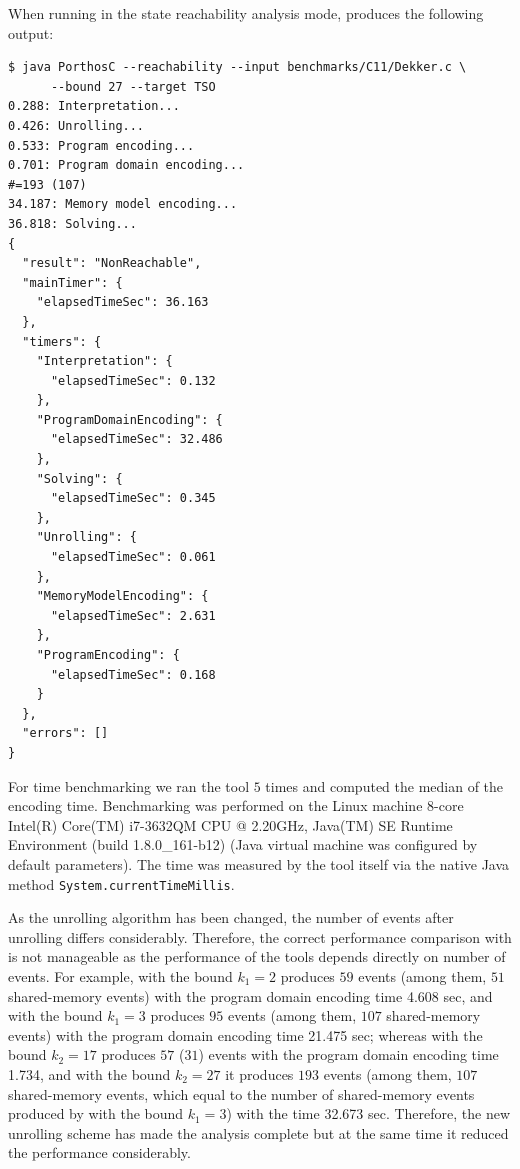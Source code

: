 When running in the state reachability analysis mode, \porthos[2] produces the following output:

\begin{lstlisting}
$ java PorthosC --reachability --input benchmarks/C11/Dekker.c \
      --bound 27 --target TSO
0.288: Interpretation...
0.426: Unrolling...
0.533: Program encoding...
0.701: Program domain encoding...
#=193 (107)
34.187: Memory model encoding...
36.818: Solving...
{
  "result": "NonReachable",
  "mainTimer": {
    "elapsedTimeSec": 36.163
  },
  "timers": {
    "Interpretation": {
      "elapsedTimeSec": 0.132
    },
    "ProgramDomainEncoding": {
      "elapsedTimeSec": 32.486
    },
    "Solving": {
      "elapsedTimeSec": 0.345
    },
    "Unrolling": {
      "elapsedTimeSec": 0.061
    },
    "MemoryModelEncoding": {
      "elapsedTimeSec": 2.631
    },
    "ProgramEncoding": {
      "elapsedTimeSec": 0.168
    }
  },
  "errors": []
}
\end{lstlisting}

For time benchmarking we ran the tool $5$ times and computed the median of the encoding time.
Benchmarking was performed on the Linux machine 8-core Intel(R) Core(TM) i7-3632QM CPU @ 2.20GHz, Java(TM) SE Runtime Environment (build 1.8.0\_161-b12) (Java virtual machine was configured by default parameters).
The time was measured by the tool itself via the native Java method \texttt{System.currentTimeMillis}.

As the unrolling algorithm has been changed, the number of events after unrolling differs considerably.
Therefore, the correct performance comparison with \porthos[1] is not manageable as the performance of the tools depends directly on number of events.
For example, with the bound $k_1=2$ \porthos[1] produces $59$ events (among them, $51$ shared-memory events) with the program domain encoding time 4.608 sec,
and with the bound $k_1=3$ \porthos[1] produces $95$ events (among them, $107$ shared-memory events) with the program domain encoding time 21.475 sec;
whereas \porthos[2] with the bound $k_2=17$ produces $57$ ($31$) events with the program domain encoding time 1.734, and with the bound $k_2=27$ it produces $193$ events (among them, $107$ shared-memory events, which equal to the number of shared-memory events produced by \porthos[1] with the bound $k_1=3$) with the time 32.673 sec.
Therefore, the new unrolling scheme has made the analysis complete but at the same time it reduced the performance considerably.


